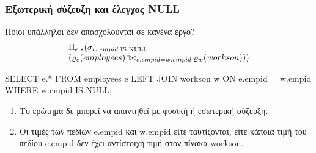 \begin{frame}
\frametitle{Εξωτερική σύζευξη και έλεγχος {\en NULL}}
\begin{minipage}{\wE}
\vspace*{-0.5cm}
\begin{exampleblock}{\small Ποιοι υπάλληλοι δεν απασχολούνται σε κανένα έργο?}
\en
\[
\begin{array}{l}
  \Pi_{e.*}
  (\sigma_{w.empid \text{ IS NULL}}                    \\
    ( \varrho_{e}(employees) \lojoin_{e.empid = w.empid} \varrho_{w}(workson) )
  )
\end{array}
\]
\pause
\en
\begin{SQL}
  SELECT e.*
    FROM employees e LEFT JOIN workson w
                       ON e.empid = w.empid
   WHERE w.empid IS NULL;
\end{SQL}
\el
\end{exampleblock}
\small
\begin{enumerate}
  \item Το ερώτημα δε μπορεί να απαντηθεί με φυσική ή εσωτερική σύζευξη.
  \item Οι τιμές των πεδίων {\ra e.empid} και {\ra w.empid}   είτε ταυτίζονται,
        είτε κάποια τιμή   του πεδίου {\ra e.empid}  δεν έχει    αντίστοιχη
        τιμή στον πίνακα {\ra workson}.
\end{enumerate}
\end{minipage}
\end{frame}


